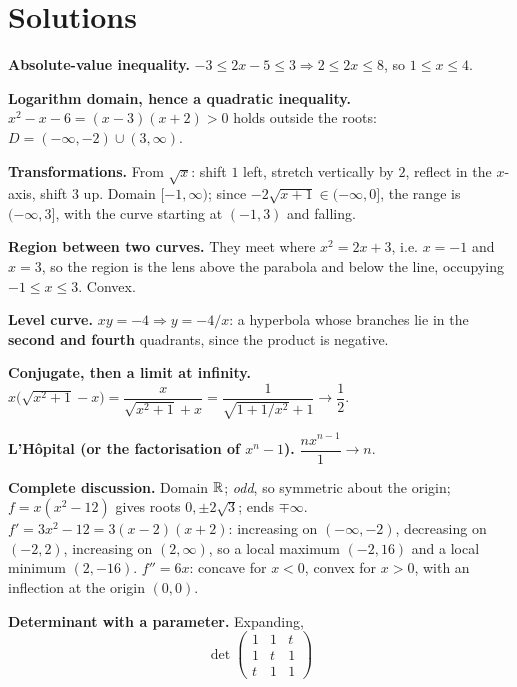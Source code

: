 \section{Solutions}

\begin{solutions}
  \item \textbf{Absolute-value inequality.}
        $-3\le2x-5\le3\Rightarrow2\le2x\le8$, so $1\le x\le4$.
  \item \textbf{Logarithm domain, hence a quadratic inequality.}
        $x^{2}-x-6=(x-3)(x+2)>0$ holds outside the roots:
        $D=(-\infty,-2)\cup(3,\infty)$.
  \item \textbf{Transformations.} From $\sqrt{x}$: shift $1$ left, stretch
        vertically by $2$, reflect in the $x$-axis, shift $3$ up. Domain
        $[-1,\infty)$; since $-2\sqrt{x+1}\in(-\infty,0]$, the range is
        $(-\infty,3]$, with the curve starting at $(-1,3)$ and falling.
  \item \textbf{Region between two curves.} They meet where
        $x^{2}=2x+3$, i.e. $x=-1$ and $x=3$, so the region is the lens
        above the parabola and below the line, occupying
        $-1\le x\le3$. Convex.
  \item \textbf{Level curve.} $xy=-4\Rightarrow y=-4/x$: a hyperbola whose
        branches lie in the \textbf{second and fourth} quadrants, since the
        product is negative.
  \item \textbf{Conjugate, then a limit at infinity.}
        $x\bigl(\sqrt{x^{2}+1}-x\bigr)
        =\dfrac{x}{\sqrt{x^{2}+1}+x}
        =\dfrac{1}{\sqrt{1+1/x^{2}}+1}\to\dfrac12$.
  \item \textbf{L'H\^opital (or the factorisation of $x^{n}-1$).}
        $\dfrac{nx^{n-1}}{1}\to n$.
  \item \textbf{Complete discussion.} Domain $\mathbb{R}$; \emph{odd}, so
        symmetric about the origin; $f=x(x^{2}-12)$ gives roots
        $0,\pm2\sqrt3$; ends $\mp\infty$. $f'=3x^{2}-12=3(x-2)(x+2)$:
        increasing on $(-\infty,-2)$, decreasing on $(-2,2)$, increasing on
        $(2,\infty)$, so a local maximum $(-2,16)$ and a local minimum
        $(2,-16)$. $f''=6x$: concave for $x<0$, convex for $x>0$, with an
        inflection at the origin $(0,0)$.
  \item \textbf{Determinant with a parameter.} Expanding,
        \[
          \det\begin{pmatrix}1&1&t\\1&t&1\\t&1&1\end{pmatrix}
\]
\end{solutions}
